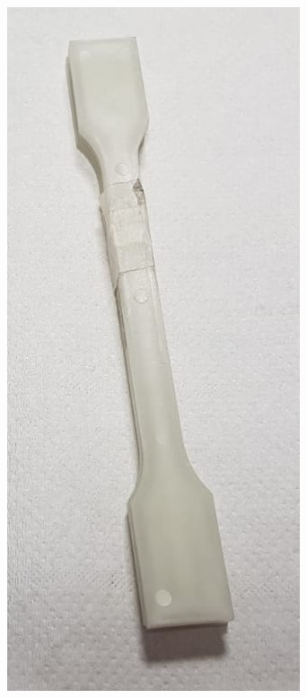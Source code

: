 \documentclass[a4paper, 11pt]{article}
\begin{document}
\begin{figure}[htp]
{\includegraphics[scale=0.2]{PPW}} \qquad
\subfloat[][]

\end{figure}
\end{document}
